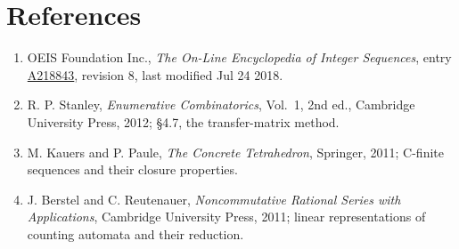 \documentclass[11pt]{article}
\theoremstyle{definition}
\begin{document}
\section{References}

\begin{enumerate}

\item OEIS Foundation Inc., \emph{The On-Line Encyclopedia of Integer Sequences}, entry \href{https://oeis.org/A218843}{A218843}, revision 8, last modified Jul 24 2018.

\item R. P. Stanley, \emph{Enumerative Combinatorics}, Vol.~1, 2nd ed., Cambridge University Press, 2012; \S4.7, the transfer-matrix method.

\item M. Kauers and P. Paule, \emph{The Concrete Tetrahedron}, Springer, 2011; C-finite sequences and their closure properties.

\item J. Berstel and C. Reutenauer, \emph{Noncommutative Rational Series with Applications}, Cambridge University Press, 2011; linear representations of counting automata and their reduction.

\end{enumerate}
\end{document}
